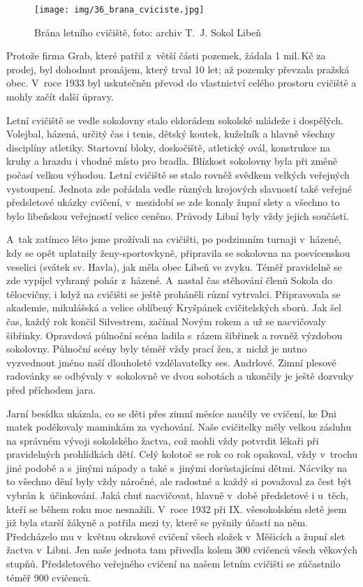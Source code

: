 \documentclass[a5paper, 11pt, twoside]{article}
\begin{document}
\begin{figure}[h!]
  \centering 
  \texttt{[image: img/36\_brana\_cviciste.jpg]}
  \caption*{Brána letního cvičiště, foto: archiv T.~J. Sokol Libeň}
\end{figure}

Protože firma Grab, které patřil z~větší části pozemek, žádala 1 mil.\,Kč
za prodej, byl dohodnut pronájem, který trval 10 let; až pozemky
převzala pražská obec. V~roce 1933 byl uskutečněn převod do vlastnictví
celého prostoru cvičiště a mohly začít další úpravy.

Letní cvičiště se vedle sokolovny stalo eldorádem sokolské mládeže i
dospělých. Volejbal, házená, určitý čas i tenis, dětský koutek, kuželník
a hlavně všechny disciplíny atletiky. Startovní bloky, doskočiště,
atletický ovál, konstrukce na kruhy a hrazdu i vhodné místo pro bradla.
Blízkost sokolovny byla při změně počasí velkou výhodou. Letní cvičiště
se stalo rovněž svědkem velkých veřejných vystoupení. Jednota zde
pořádala vedle různých krojových slavností také veřejné předsletové
ukázky cvičení, v~mezidobí se zde konaly župní slety a všechno to bylo
libeňskou veřejností velice ceněno. Průvody Libní byly vždy jejich
součástí.

A~tak zatímco léto jsme prožívali na cvičišti, po podzimním turnaji
v~házené, kdy se opět uplatnily ženy-sportovkyně, připravila se sokolovna
na posvícenskou veselici (svátek sv. Havla), jak měla obec Libeň ve
zvyku. Téměř pravidelně se zde vypíjel vyhraný pohár z~házené. A~nastal
čas stěhování členů Sokola do tělocvičny, i když na cvičišti se ještě
proháněli různí vytrvalci. Připravovala se akademie, mikulášská a velice
oblíbený Kryšpánek cvičitelských sborů. Jak šel čas, každý rok končil
Silvestrem, začínal Novým rokem a už se nacvičovaly šibřinky. Opravdová
půlnoční scéna ladila s~rázem šibřinek a rovněž výzdobou sokolovny.
Půlnoční scény byly téměř vždy prací žen, z~nichž je nutno vyzvednout
jméno naší dlouholeté vzdělavatelky ses. Andrlové. Zimní plesové
radovánky se odbývaly v~sokolovně ve dvou sobotách a ukončily je ještě
dozvuky před příchodem jara.

Jarní besídka ukázala, co se děti přes zimní měsíce naučily ve cvičení,
ke Dni matek poděkovaly maminkám za vychování. Naše cvičitelky měly
velkou zásluhu na správném vývoji sokolského žactva, což mohli vždy
potvrdit lékaři při pravidelných prohlídkách dětí. Celý kolotoč se rok
co rok opakoval, vždy v~trochu jiné podobě a s~jinými nápady a také
s~jinými dorůstajícími dětmi. Nácviky na to všechno dění byly vždy
náročné, ale radostné a každý si považoval za čest být vybrán
k~účinkování. Jaká chuť nacvičovat, hlavně v~době předsletové i u~těch,
kteří se během roku moc nesnažili. V~roce 1932 při IX. všesokolském
sletě jsem již byla starší žákyně a patřila mezi ty, které se pyšnily
účastí na něm. Předcházelo mu v~květnu okrskové cvičení všech složek
v~Měšicích a župní slet žactva v~Libni. Jen naše jednota tam přivedla
kolem 300 cvičenců všech věkových stupňů. Předsletového veřejného
cvičení na našem letním cvičišti se zúčastnilo téměř 900 cvičenců.
\end{document}
